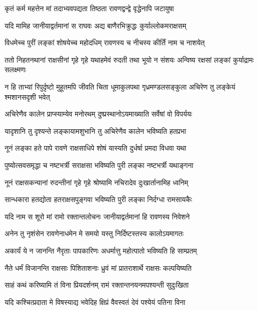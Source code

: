\twolineshloka
{कृतं कर्म महत्तेन मां तदाभ्यवपद्यता}
{तिष्ठता रावणद्वन्द्वे वृद्धेनापि जटायुषा} %

\twolineshloka
{यदि मामिह जानीयाद्वर्तमानां स राघवः}
{अद्य बाणैरभिक्रुद्धः कुर्याल्लोकमराक्षसम्} %

\twolineshloka
{विधमेच्च पुरीं लङ्कां शोषयेच्च महोदधिम्}
{रावणस्य च नीचस्य कीर्तिं नाम च नाशयेत्} %

\threelineshloka
{ततो निहतनथानां राक्षसीनां गृहे गृहे}
{यथाहमेवं रुदती तथा भूयो न संशयः}
{अन्विष्य रक्षसां लङ्कां कुर्याद्रामः सलक्ष्मणः} %

\threelineshloka
{न हि ताभ्यां रिपुर्दृष्टो मुहूतमपि जीवति}
{चिता धूमाकुलपथा गृध्रमण्डलसङ्कुला}
{अचिरेण तु लङ्केयं श्मशानसदृशी भवेत्} %

\twolineshloka
{अचिरेणैव कालेन प्राप्स्याम्येव मनोरथम्}
{दुष्प्रस्थानोऽयमाख्याति सर्वेषां वो विपर्ययः} %

\twolineshloka
{यादृशानि तु दृश्यन्ते लङ्कायामशुभानि तु}
{अचिरेणैव कालेन भविष्यति हतप्रभा} %

\twolineshloka
{नूनं लङ्का हते पापे रावणे राक्षसाधिपे}
{शोषं यास्यति दुर्धर्षा प्रमदा विधवा यथा} %

\twolineshloka
{पुष्योत्सवसमृद्धा च नष्टभर्त्री सराक्षसा}
{भविष्यति पुरी लङ्का नष्टभर्त्री यथाङ्गना} %

\twolineshloka
{नूनं राक्षसकन्यानां रुदन्तीनां गृहे गृहे}
{श्रोष्यामि नचिरादेव दुःखार्तानामिह ध्वनिम्} %

\twolineshloka
{सान्धकारा हतद्योता हतराक्षसपुङ्गवा}
{भविष्यति पुरी लङ्का निर्दग्धा रामसायकैः} %

\twolineshloka
{यदि नाम स शूरो मां रामो रक्तान्तलोचनः}
{जानीयाद्वर्तमानां हि रावणस्य निवेशने} %

\twolineshloka
{अनेन तु नृशंसेन रावणेनाधमेन मे}
{समयो यस्तु निर्दिष्टस्तस्य कालोऽयमागतः} %

\twolineshloka
{अकार्यं ये न जानन्ति नैरृताः पापकारिणः}
{अधर्मात्तु महोत्पातो भविष्यति हि साम्प्रतम्} %

\twolineshloka
{नैते धर्मं विजानन्ति राक्षसाः पिशिताशनाः}
{ध्रुवं मां प्रातराशार्थे राक्षसः कल्पयिष्यति} %

\twolineshloka
{साहं कथं करिष्यामि तं विना प्रियदर्शनम्}
{रामं रक्तान्तनयनमपश्यन्ती सुदुःखिता} %

\twolineshloka
{यदि कश्चित्प्रदाता मे विषस्याद्य भवेदिह}
{क्षिप्रं वैवस्वतं देवं पश्येयं पतिना विना} %

